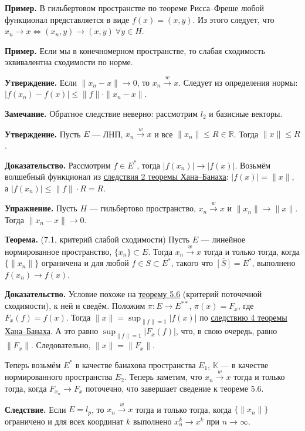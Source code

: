 \textbf{Пример.} В гильбертовом пространстве по теореме Рисса--Фреше любой функционал представляется в виде $f(x) = (x, y)$.
Из этого следует, что $x_n \to x \iff (x_n, y) \to (x, y)~\forall y \in H$.

\textbf{Пример.} Если мы в конечномерном пространстве, то слабая сходимость эквивалентна сходимости по норме.

\textbf{Утверждение.} Если $\|x_n - x\| \to 0$, то $x_n \xrightarrow{w} x$.
Следует из определения нормы: $|f(x_n) - f(x)| \le \|f\| \cdot \|x_n - x\|$.

\textbf{Замечание.} Обратное следствие неверно: рассмотрим $l_2$ и базисные векторы.

\textbf{Утверждение.} Пусть $E$ --- ЛНП, $x_n \xrightarrow{w} x$ и все $\|x_n\| \le R \in \mathbb R$.
Тогда $\|x\| \le R$.

\textbf{Доказательство.} Рассмотрим $f \in E^*$, тогда $|f(x_n)| \to |f(x)|$.
Возьмём волшебный функционал из \hyperref[th:hahn-banach-coll-2]{следствия 2 теоремы Хана--Банаха}: $|f(x)| = \|x\|$, а $|f(x_n)| \le \|f\| \cdot R = R$.

\QED

\textbf{Упражнение.} Пусть $H$ --- гильбертово пространство, $x_n \xrightarrow{w} x$ и $\|x_n\| \to \|x\|$.
Тогда $\|x_n - x\| \to 0$.

\label{th:7-1} \textbf{Теорема.} (7.1, критерий слабой сходимости) Пусть $E$ --- линейное нормированное пространство, $\{x_n\} \subset E$.
Тогда $x_n \xrightarrow{w} x$ тогда и только тогда, когда $\{\|x_n\|\}$ ограничена и для любой $f \in S \subset E^*$, такого что $\overline{[S]} = E^*$, выполнено $f(x_n) \to f(x)$.

\textbf{Доказательство.} Условие похоже на \hyperref[th:5-6]{теорему 5.6} (критерий поточечной сходимости), к ней и сведём.
Положим $\pi: E \to E^{**}$, $\pi(x) = F_x$, где $F_x(f) = f(x)$.
Тогда $\|x\| = \sup_{\|f\| = 1} |f(x)|$ по \hyperref[th:hahn-banach-coll-4]{следствию 4 теоремы Хана--Банаха}.
А это равно $\sup_{\|f\| = 1} |F_x(f)|$, что, в свою очередь, равно $\|F_x\|$.
Следовательно, $\|x\| = \|F_x\|$.

Теперь возьмём $E^*$ в качестве банахова пространства $E_1$, $\mathbb K$ --- в качестве нормированного пространства $E_2$.
Теперь заметим, что $x_n \xrightarrow{w} x$ тогда и только тогда, когда $F_{x_n} \to F_x$ поточечно, что завершает сведение к теореме 5.6.

\QED

\textbf{Следствие.} Если $E = l_p$, то $x_n \xrightarrow{w} x$ тогда и только тогда, когда $\{\|x_n\|\}$ ограничено и для всех координат $k$ выполнено $x_n^k \to x^k$ при $n \to \infty$.

